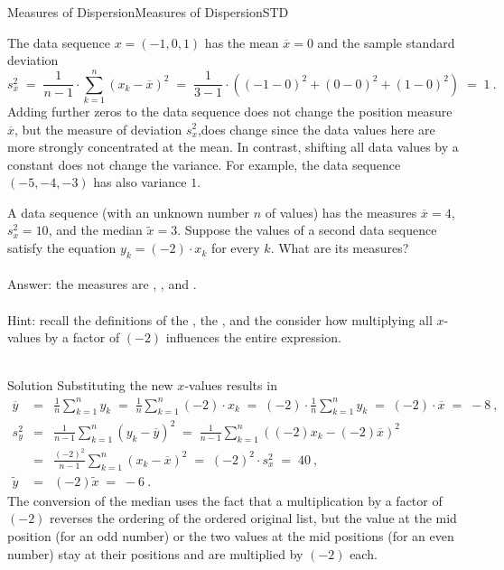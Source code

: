 \begin{MXContent}{Measures of Dispersion}{Measures of Dispersion}{STD}
\begin{MExample}
The data sequence $x=(-1,0,1)$ has the mean $\overline{x}=0$ and the sample standard deviation 
$$
s^2_x \;=\;\frac{1}{n-1}\cdot \sum\limits_{k=1}^{n}(x_{k}-\overline{x})^{2}\;=\; \frac1{3-1}\cdot \left({(-1-0)^2+(0-0)^2+(1-0)^2}\right)\;=\; 1\: .
$$
Adding further zeros to the data sequence does not change the position measure $\overline{x}$, but the 
measure of deviation $s^2_x$,does change since the data values here are more strongly concentrated at the mean. 
In contrast, shifting all data values by a constant does not change the variance. For example, the data 
sequence $(-5,-4,-3)$ has also variance $1$.
\end{MExample}

\begin{MExercise}
A data sequence (with an unknown number $n$ of values) has the measures $\overline{x}=4$, $s^2_x=10$, 
and the median $\tilde x=3$. Suppose the values of a second data sequence satisfy the equation 
$y_k = (-2)\cdot x_k$ for every $k$. What are its measures?
\ \\ \ \\
Answer: the measures are , ,
and .
\ \\ \ \\
Hint: recall the definitions of the , the , and 
the  consider how multiplying all $x$-values by a factor of $(-2)$ influences the entire expression.
\ \\ \ \\
\begin{MHint}{Solution}
Substituting the new $x$-values results in
\begin{eqnarray*}
\overline{y} &=& \frac1n\sum_{k=1}^n y_k \;=\;\frac1n\sum_{k=1}^n (-2)\cdot x_k \;=\; (-2)\cdot \frac1n\sum_{k=1}^n y_k \;=\; (-2)\cdot \overline{x} \;=\; -8\:,\\
s^2_y &=& \frac1{n-1}\sum_{k=1}^n \left({y_k-\overline{y}}\right)^2 \;=\;\frac1{n-1}\sum_{k=1}^n \left({(-2)x_k-(-2)\overline{x}}\right)^2\ \\
&=& \frac{(-2)^2}{n-1}\sum_{k=1}^n \left({x_k-\overline{x}}\right)^2 \;=\; (-2)^2\cdot s_x^2 \;=\;40\: ,\ \\
\tilde{y} &=& (-2)\tilde{x} \;=\; -6\: .
\end{eqnarray*}
The conversion of the median uses the fact that a multiplication by a factor of $(-2)$ reverses the ordering 
of the ordered original list, but the value at the mid position (for an odd number) or the two values at the mid positions 
(for an even number) stay at their positions and are multiplied by $(-2)$ each.
\end{MHint}
\end{MExercise}
\end{MXContent}


